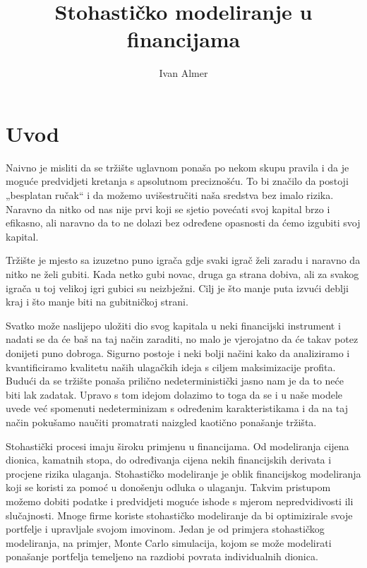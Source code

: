 \documentclass[times, utf8, seminar]{fer}
\begin{document}
\title{Stohastičko modeliranje u financijama}

\author{Ivan Almer}


\maketitle

\tableofcontents

\chapter{Uvod}
Naivno je misliti da se tržište uglavnom ponaša po nekom skupu pravila i da je moguće predvidjeti kretanja s apsolutnom preciznošću. To bi značilo da postoji „besplatan ručak“ i da možemo uvišestručiti naša sredstva bez imalo rizika. Naravno da nitko od nas nije prvi koji se sjetio povećati svoj kapital brzo i efikasno, ali naravno da to ne dolazi bez određene opasnosti da ćemo izgubiti svoj kapital.

Tržište je mjesto sa izuzetno puno igrača gdje svaki igrač želi zaradu i naravno da nitko ne želi gubiti. Kada netko gubi novac, druga ga strana dobiva, ali za svakog igrača u toj velikoj igri gubici su neizbježni. Cilj je što manje puta izvući deblji kraj i što manje biti na gubitničkoj strani.

Svatko može naslijepo uložiti dio svog kapitala u neki financijski instrument i nadati se da će baš na taj način zaraditi, no malo je vjerojatno da će takav potez donijeti puno dobroga. Sigurno postoje i neki bolji načini kako da analiziramo i kvantificiramo kvalitetu naših ulagačkih ideja s ciljem maksimizacije profita. Budući da se tržište ponaša prilično nedeterministički jasno nam je da to neće biti lak zadatak. Upravo s tom idejom dolazimo to toga da se i u naše modele uvede već spomenuti nedeterminizam s određenim karakteristikama i da na taj način pokušamo naučiti promatrati naizgled kaotično ponašanje tržišta.

Stohastički procesi imaju široku primjenu u financijama. Od modeliranja cijena dionica, kamatnih stopa, do određivanja cijena nekih financijskih derivata i procjene rizika ulaganja. Stohastičko modeliranje je oblik financijskog modeliranja koji se koristi za pomoć u donošenju odluka o ulaganju. Takvim pristupom možemo dobiti podatke i predvidjeti moguće ishode s mjerom nepredvidivosti ili slučajnosti. Mnoge firme koriste stohastičko modeliranje da bi optimizirale svoje portfelje i upravljale svojom imovinom. Jedan je od primjera stohastičkog modeliranja, na primjer, Monte Carlo simulacija, kojom se može modelirati ponašanje portfelja temeljeno na razdiobi povrata individualnih dionica.
\end{document}

